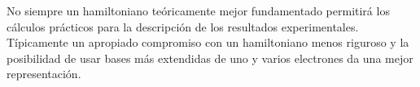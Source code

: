 No siempre un hamiltoniano te\'oricamente mejor fundamentado 
permitir\'a los c\'alculos pr\'acticos para la descripci\'on de 
los resultados experimentales. T\'ipicamente un apropiado 
compromiso con un hamiltoniano menos riguroso y la posibilidad de 
usar bases m\'as extendidas de uno y varios electrones da una mejor 
representaci\'on. 
